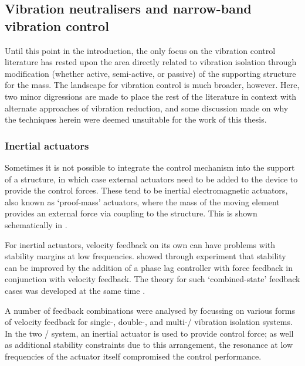 \documentclass[11pt,a4paper]{memoir}
\begin{document}
\subsection{Vibration neutralisers and narrow-band vibration control}

Until this point in the introduction, the only focus on the vibration control literature has rested upon the area directly related to vibration isolation through modification (whether active, semi-active, or passive) of the supporting structure for the mass.
The landscape for vibration control is much broader, however.
Here, two minor digressions are made to place the rest of the literature in context with alternate approaches of vibration reduction, and some discussion made on why the techniques herein were deemed unsuitable for the work of this thesis.


\subsubsection{Inertial actuators}

Sometimes it is not possible to integrate the control mechanism into the support of a structure, in which case external actuators need to be added to the device to provide the control forces.
These tend to be inertial electromagnetic actuators, also known as `proof-mass' actuators, where the mass of the moving element provides an external force via coupling to the structure.
This is shown schematically in .

\begin{figure}
\end{figure}

For inertial actuators, velocity feedback on its own can have problems with stability margins at low frequencies.
\textcite{benassi2002-part2} showed through experiment that stability can be improved by the addition of a phase lag controller with force feedback in conjunction with velocity feedback.
The theory for such `combined-state' feedback cases was developed at the same time \cite{benassi2002-double}.

A number of feedback combinations were analysed by \textcite{diaz2005} focussing on various forms of velocity feedback for \mbox{single-,} \mbox{double-,} and multi-\dof/ vibration isolation systems.
In the two \dof/ system, an inertial actuator is used to provide control force; as well as additional stability constraints due to this arrangement, the resonance at low frequencies of the actuator itself compromised the control performance.
\end{document}
